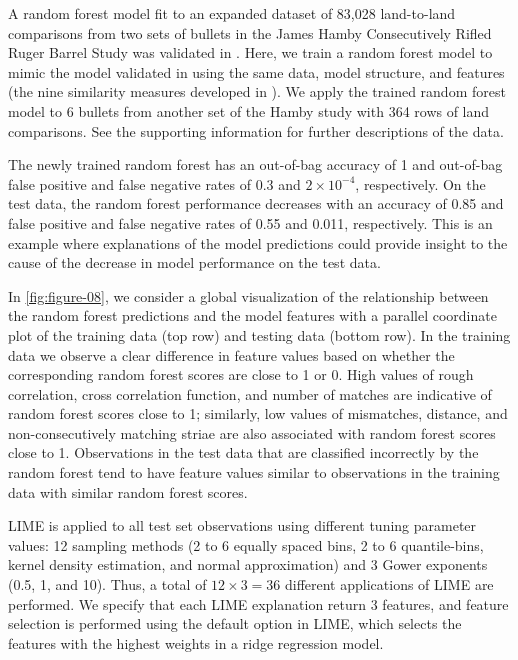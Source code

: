 \documentclass[AMS,STIX2COL]{WileyNJD-v2}\usepackage[]{graphicx}\usepackage[]{color}
\begin{document}
A random forest model fit to an expanded dataset of 83,028 land-to-land comparisons from two sets of bullets in the James Hamby Consecutively Rifled Ruger Barrel Study \citep{hamby:2009} was validated in \citet{vanderplas:2020}. Here, we train a random forest model to mimic the model validated in \citet{vanderplas:2020} using the same data, model structure, and features (the nine similarity measures developed in \citet{hare:2017}). We apply the trained random forest model to 6 bullets from another set of the Hamby study with 364 rows of land comparisons. See the supporting information for further descriptions of the data. 

The newly trained random forest has an out-of-bag accuracy of 1 and out-of-bag false positive and false negative rates of 0.3 and \ensuremath{2\times 10^{-4}}, respectively. On the test data, the random forest performance decreases with an accuracy of 0.85 and false positive and false negative rates of 0.55 and 0.011, respectively. This is an example where explanations of the model predictions could provide insight to the cause of the decrease in model performance on the test data.

In \autoref{fig:figure-08},  we consider a global visualization of the relationship between the random forest predictions and the model features with a parallel coordinate plot of the training data (top row) and testing data (bottom row). In the training data we observe a clear difference in feature values based on whether the corresponding random forest scores are close to 1 or 0. High values of rough correlation, cross correlation function, and number of matches are indicative of random forest scores close to 1; similarly, low values of mismatches, distance, and non-consecutively matching striae are also associated with random forest scores close to 1. Observations in the test data that are classified incorrectly by the random forest tend to have feature values similar to observations in the training data with similar random forest scores. 

LIME is applied to all test set observations using different tuning parameter values: 12 sampling methods (2 to 6 equally spaced bins, 2 to 6 quantile-bins, kernel density estimation, and normal approximation) and 3 Gower exponents (0.5, 1, and 10). Thus, a total of $12\times 3=36$ different applications of LIME are performed. We specify that each LIME explanation return 3 features, and feature selection is performed using the default option in LIME, which selects the features with the highest weights in a ridge regression model.
\end{document}
